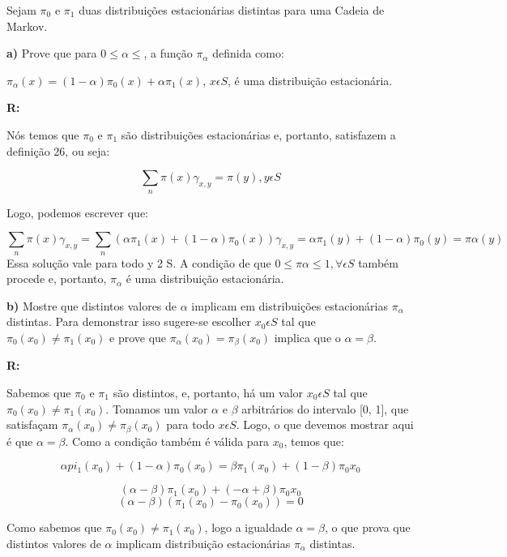 \documentclass[
]{article}
\begin{document}
Sejam \(\pi_{0}\) e \(\pi_{1}\) duas distribuições estacionárias
distintas para uma Cadeia de Markov.

\textbf{a)} Prove que para \(0\leq\alpha\leq\), a função
\(\pi_{\alpha}\) definida como:

\(\pi_{\alpha}(x)=(1-\alpha)\pi_{0}(x)+\alpha \pi_{1}(x)\),
\(x\epsilon S\), é uma distribuição estacionária.

\textbf{R:}

Nós temos que \(\pi_{0}\) e \(\pi_{1}\) são distribuições estacionárias
e, portanto, satisfazem a definição 26, ou seja:

\[\sum_{n}\pi(x)\gamma_{x,y}=\pi(y),y\epsilon S\]

Logo, podemos escrever que:

\[\sum_{n}\pi(x)\gamma_{x,y}=\sum_{n}(\alpha \pi_{1}(x)+(1-\alpha)\pi_{0}(x))\gamma_{x,y}=\alpha \pi_{1}(y)+(1-\alpha)\pi_{0}(y)=\pi\alpha(y)\]
Essa solução vale para todo y 2 S. A condição de que
\(0 \leq \pi\alpha \leq 1, \forall \epsilon S\) também procede e,
portanto, \(\pi_{\alpha}\) é uma distribuição estacionária.

\textbf{b)} Mostre que distintos valores de \(\alpha\) implicam em
distribuições estacionárias \(\pi_{\alpha}\) distintas. Para demonstrar
isso sugere-se escolher \(x_{0} \epsilon S\) tal que
\(\pi_{0}(x_{0})\neq\pi_{1}(x_{0})\) e prove que
\(\pi_{\alpha}(x_{0})=\pi_{\beta}(x_{0})\) implica que o
\(\alpha = \beta\).

\textbf{R:}

Sabemos que \(\pi_{0}\) e \(\pi_{1}\) são distintos, e, portanto, há um
valor \(x_{0} \epsilon S\) tal que
\(\pi_{0}(x_{0})\neq \pi_{1}(x_{0})\). Tomamos um valor \(\alpha\) e
\(\beta\) arbitrários do intervalo {[}0, 1{]}, que satisfaçam
\(\pi_{\alpha}(x_{0})\neq \pi_{\beta}(x_{0})\) para todo
\(x \epsilon S\). Logo, o que devemos mostrar aqui é que
\(\alpha = \beta\). Como a condição também é válida para \(x_{0}\),
temos que:

\[\alpha pi_{1}(x_{0})+(1- \alpha)\pi_{0}(x_{0})=\beta \pi_{1}(x_{0})+(1-\beta)\pi_{0}x_{0}\]

\[(\alpha -\beta) \pi_{1}(x_{0})+(-\alpha +\beta)\pi_{0}x_{0}\]
\[(\alpha -\beta) (\pi_{1}(x_{0})-\pi_{0}(x_{0}))=0\]

Como sabemos que \(\pi_{0}(x_{0})\neq \pi_{1}(x_{0})\), logo a igualdade
\(\alpha=\beta\), o que prova que distintos valores de \(\alpha\)
implicam distribuição estacionárias \(\pi_{\alpha}\) distintas.
\end{document}
